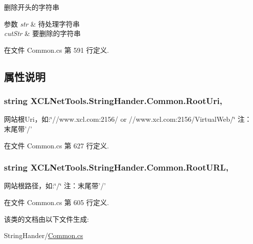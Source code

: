 删除开头的字符串 


\begin{DoxyParams}{参数}
{\em str} & 待处理字符串\\
\hline
{\em cut\-Str} & 要删除的字符串\\
\hline
\end{DoxyParams}


在文件 Common.\-cs 第 591 行定义.



\subsection{属性说明}
\hypertarget{class_x_c_l_net_tools_1_1_string_hander_1_1_common_ae924e6a3e073efd4a75d53ea7095f976}{
\subsubsection[{Root\-Uri}]{\setlength{\rightskip}{0pt plus 5cm}string X\-C\-L\-Net\-Tools.\-String\-Hander.\-Common.\-Root\-Uri\hspace{0.3cm}{\ttfamily [static]}, {\ttfamily [get]}}}\label{class_x_c_l_net_tools_1_1_string_hander_1_1_common_ae924e6a3e073efd4a75d53ea7095f976}


网站根\-Uri，如\-:\char`\"{}//www.\-xcl.\-com\-:2156/ or //www.\-xcl.\-com\-:2156/\-Virtual\-Web/\char`\"{} 注：末尾带'/' 



在文件 Common.\-cs 第 627 行定义.

\hypertarget{class_x_c_l_net_tools_1_1_string_hander_1_1_common_a87e9775b7bdaaf9bc205a148b1335ee2}{
\subsubsection[{Root\-U\-R\-L}]{\setlength{\rightskip}{0pt plus 5cm}string X\-C\-L\-Net\-Tools.\-String\-Hander.\-Common.\-Root\-U\-R\-L\hspace{0.3cm}{\ttfamily [static]}, {\ttfamily [get]}}}\label{class_x_c_l_net_tools_1_1_string_hander_1_1_common_a87e9775b7bdaaf9bc205a148b1335ee2}


网站根路径，如\-:\char`\"{}/\char`\"{} 注：末尾带'/' 



在文件 Common.\-cs 第 605 行定义.



该类的文档由以下文件生成\-:\begin{DoxyCompactItemize}
\item 
String\-Hander/\hyperlink{_common_8cs}{Common.\-cs}\end{DoxyCompactItemize}

